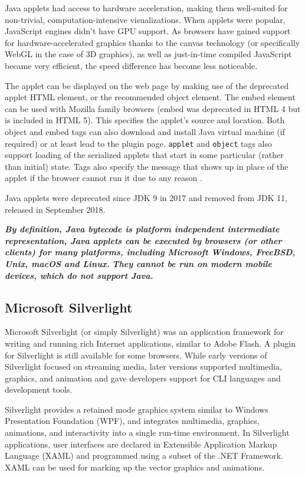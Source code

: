 Java applets had access to hardware acceleration, making them well-suited for non-trivial, computation-intensive visualizations. When applets were popular, JavaScript engines didn't have GPU support.
As browsers have gained support for hardware-accelerated graphics thanks to the canvas technology (or specifically WebGL in the case of 3D graphics), 
as well as just-in-time compiled JavaScript became very efficient, the speed difference has become less noticeable.

The applet can be displayed on the web page by making use of the deprecated applet HTML element, or the recommended object element.
The embed element can be used with Mozilla family browsers (embed was deprecated in HTML 4 but is included in HTML 5). 
This specifies the applet's source and location. 
Both object and embed tags can also download and install Java virtual machine (if required) or at least lead to the plugin page. 
\texttt{applet} and \texttt{{object}} tags also support loading of the serialized applets that start in some particular (rather than initial) state. 
Tags also specify the message that shows up in place of the applet if the browser cannot run it due to any reason \cite{Wiki_Applet}.

Java applets were deprecated since JDK 9 in 2017 and removed from JDK 11, released in September 2018.

\textit{\textbf{By definition, Java bytecode is platform independent intermediate representation, Java applets can be executed by browsers (or other clients) for many platforms, including Microsoft Windows, FreeBSD, Unix, macOS and Linux.}}
\textit{\textbf{They cannot be run on modern mobile devices, which do not support Java.}}

\subsection{Microsoft Silverlight} \cite{Wiki_Silver}

Microsoft Silverlight (or simply Silverlight) was an application framework for writing and running rich Internet applications, similar to Adobe Flash. 
A plugin for Silverlight is still available for some browsers. 
While early versions of Silverlight focused on streaming media, later versions supported multimedia, graphics, and animation and gave developers support for CLI languages and development tools.

Silverlight provides a retained mode graphics system similar to Windows Presentation Foundation (WPF), and integrates multimedia, graphics, animations, and interactivity into a single run-time environment. 
In Silverlight applications, user interfaces are declared in Extensible Application Markup Language (XAML) and programmed using a subset of the .NET Framework. 
XAML can be used for marking up the vector graphics and animations.

